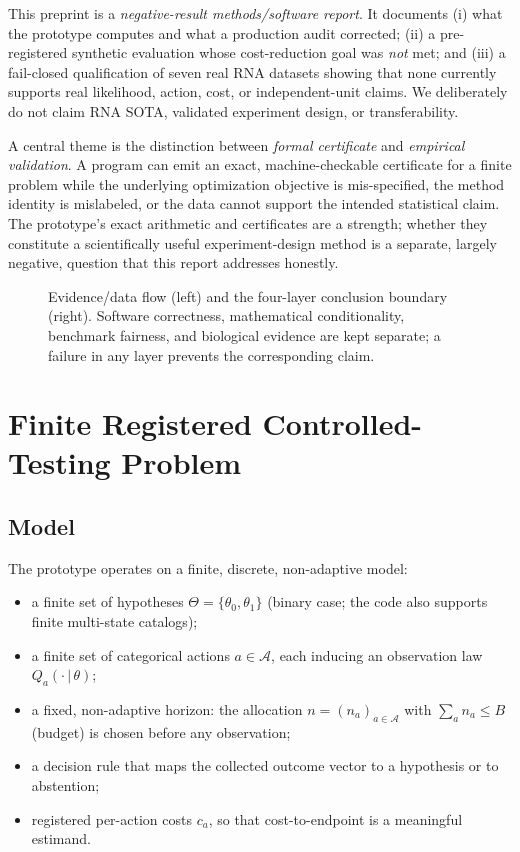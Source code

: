 \documentclass[11pt]{article}
\begin{document}
This preprint is a \emph{negative-result methods/software report}. It documents (i) what the prototype computes and what a production audit corrected; (ii) a pre-registered synthetic evaluation whose cost-reduction goal was \emph{not} met; and (iii) a fail-closed qualification of seven real RNA datasets showing that none currently supports real likelihood, action, cost, or independent-unit claims. We deliberately do not claim RNA SOTA, validated experiment design, or transferability.

A central theme is the distinction between \emph{formal certificate} and \emph{empirical validation}. A program can emit an exact, machine-checkable certificate for a finite problem while the underlying optimization objective is mis-specified, the method identity is mislabeled, or the data cannot support the intended statistical claim. The prototype's exact arithmetic and certificates are a strength; whether they constitute a scientifically useful experiment-design method is a separate, largely negative, question that this report addresses honestly.

\begin{figure}[H]\centering

\caption{Evidence/data flow (left) and the four-layer conclusion boundary (right). Software correctness, mathematical conditionality, benchmark fairness, and biological evidence are kept separate; a failure in any layer prevents the corresponding claim.}\label{fig:flow}
\end{figure}

\section{Finite Registered Controlled-Testing Problem}\label{sec:problem}

\subsection{Model}\label{sec:model}

The prototype operates on a finite, discrete, non-adaptive model:

\begin{itemize}
  \item a finite set of hypotheses $\Theta=\{\theta_0,\theta_1\}$ (binary case; the code also supports finite multi-state catalogs);
  \item a finite set of categorical actions $a\in\mathcal{A}$, each inducing an observation law $Q_a(\cdot\,|\,\theta)$;
  \item a fixed, non-adaptive horizon: the allocation $n=(n_a)_{a\in\mathcal{A}}$ with $\sum_a n_a \le B$ (budget) is chosen before any observation;
  \item a decision rule that maps the collected outcome vector to a hypothesis or to abstention;
  \item registered per-action costs $c_a$, so that cost-to-endpoint is a meaningful estimand.
\end{itemize}
\end{document}
